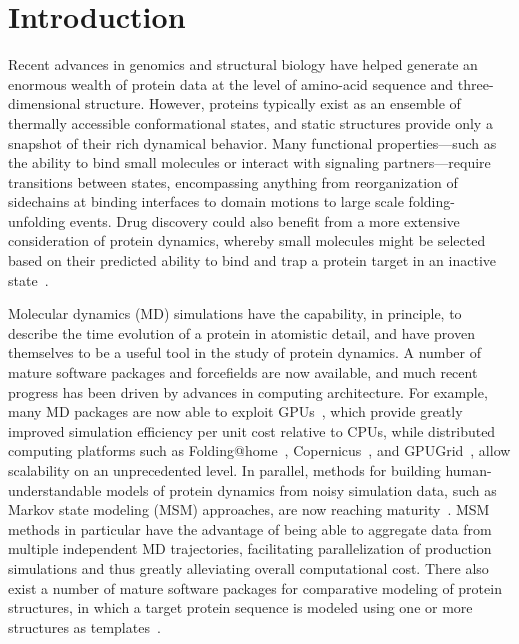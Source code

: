 \documentclass[aps,pre,twocolumn,nofootinbib,superscriptaddress,linenumbers]{revtex4-1}
\begin{document}
\maketitle

\section{Introduction}
\label{section:introduction}

Recent advances in genomics and structural biology have helped generate an enormous wealth of protein data at the level of amino-acid sequence and three-dimensional structure.
However, proteins typically exist as an ensemble of thermally accessible conformational states, and static structures provide only a snapshot of their rich dynamical behavior.
Many functional properties---such as the ability to bind small molecules or interact with signaling partners---require transitions between states, encompassing anything from reorganization of sidechains at binding interfaces to domain motions to large scale folding-unfolding events.
Drug discovery could also benefit from a more extensive consideration of protein dynamics, whereby small molecules might be selected based on their predicted ability to bind and trap a protein target in an inactive state~\cite{craik:science:2009:trapping-moving-targets}.

Molecular dynamics (MD) simulations have the capability, in principle, to describe the time evolution of a protein in atomistic detail, and have proven themselves to be a useful tool in the study of protein dynamics.
A number of mature software packages and forcefields are now available, and much recent progress has been driven by advances in computing architecture.
For example, many MD packages are now able to exploit GPUs~\cite{eastman:jctc:2012:openmm,walker:jctc:2013:amber-gpu}, which provide greatly improved simulation efficiency per unit cost relative to CPUs, while distributed computing platforms such as Folding@home~\cite{shirts-pande:science:2000:fah}, Copernicus~\cite{pronk:2011:copernicus}, and GPUGrid~\cite{buch:2010:gpugrid}, allow scalability on an unprecedented level.
In parallel, methods for building human-understandable models of protein dynamics from noisy simulation data, such as Markov state modeling (MSM) approaches, are now reaching maturity~\cite{pande-beauchamp-bowman:2010:methods:markov-model-review,noe:jcp:2011:msm-review,chodera-noe:curr-opin-struct-biol:2014:msm-review}.
MSM methods in particular have the advantage of being able to aggregate data from multiple independent MD trajectories, facilitating parallelization of production simulations and thus greatly alleviating overall computational cost.
There also exist a number of mature software packages for comparative modeling of protein structures, in which a target protein sequence is modeled using one or more structures as templates~\cite{moult:proteins:2014:casp10,baker:science:2001:structure-prediction-review}.
\end{document}
